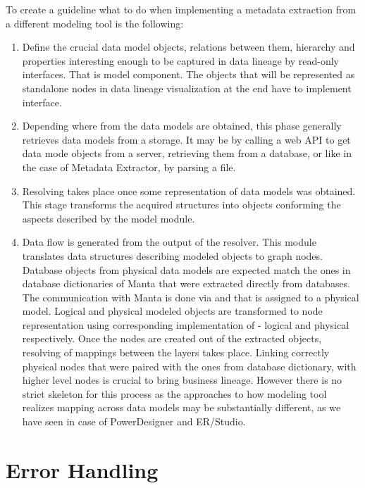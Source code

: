 To create a guideline what to do when implementing a metadata extraction from a different modeling tool is the following:

\begin{enumerate}
	\item Define the crucial data model objects, relations between them, hierarchy and properties interesting enough to be captured in data lineage by read-only interfaces. That is model component. 
	The objects that will be represented as standalone nodes in data lineage visualization at the end have to implement  interface.
	\item Depending where from the data models are obtained, this phase generally retrieves data models from a storage. It may be by calling a web API to get data mode objects from a server, retrieving them from a database, or like in the case of Metadata Extractor, by parsing a file.
	\item Resolving takes place once some representation of data models was obtained. This stage transforms the acquired structures into objects conforming the aspects described by the model module.
	\item Data flow is generated from the output of the resolver. This module translates data structures describing modeled objects to graph nodes. 
	Database objects from physical data models are expected match the ones in database dictionaries of Manta that were extracted directly from databases. 
	The communication with Manta is done via  and  that is assigned to a physical model.
	Logical and physical modeled objects are transformed to node representation using corresponding implementation of  - logical and physical respectively.
	Once the nodes are created out of the extracted objects, resolving of mappings between the layers takes place.
	Linking correctly physical nodes that were paired with the ones from database dictionary, with higher level nodes is crucial to bring business lineage. 
	However there is no strict skeleton for this process as the approaches to how modeling tool realizes mapping across data models may be substantially different, as we have seen in case of PowerDesigner and ER/Studio.
\end{enumerate} 

\section{Error Handling}

